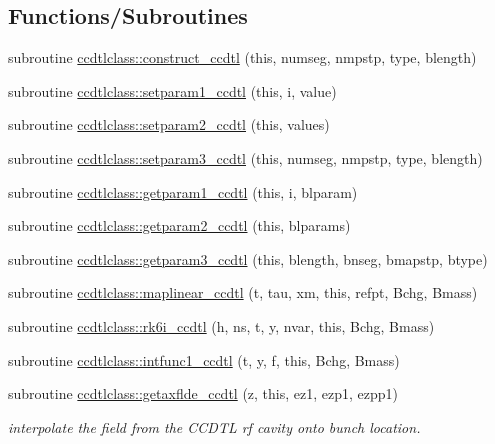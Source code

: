 \subsection*{Functions/\+Subroutines}
\begin{DoxyCompactItemize}
\item 
subroutine \mbox{\hyperlink{namespaceccdtlclass_aaa94d8179c6d59c2d3e81b64e8237962}{ccdtlclass\+::construct\+\_\+ccdtl}} (this, numseg, nmpstp, type, blength)
\item 
subroutine \mbox{\hyperlink{namespaceccdtlclass_adedaabef796136ab3b22dcc923243cfd}{ccdtlclass\+::setparam1\+\_\+ccdtl}} (this, i, value)
\item 
subroutine \mbox{\hyperlink{namespaceccdtlclass_aa32b5665906eac3911db6712a5710f97}{ccdtlclass\+::setparam2\+\_\+ccdtl}} (this, values)
\item 
subroutine \mbox{\hyperlink{namespaceccdtlclass_a3632b0f42925964cedb7778792da563f}{ccdtlclass\+::setparam3\+\_\+ccdtl}} (this, numseg, nmpstp, type, blength)
\item 
subroutine \mbox{\hyperlink{namespaceccdtlclass_a027b988ab66d8b89dabf46f5e45d82f5}{ccdtlclass\+::getparam1\+\_\+ccdtl}} (this, i, blparam)
\item 
subroutine \mbox{\hyperlink{namespaceccdtlclass_a8455f87d9ac20671adf737902c8b90d8}{ccdtlclass\+::getparam2\+\_\+ccdtl}} (this, blparams)
\item 
subroutine \mbox{\hyperlink{namespaceccdtlclass_a529631343d4306c6c486d72e2a6696a3}{ccdtlclass\+::getparam3\+\_\+ccdtl}} (this, blength, bnseg, bmapstp, btype)
\item 
subroutine \mbox{\hyperlink{namespaceccdtlclass_a520796b320588e1f31ce8587301b571b}{ccdtlclass\+::maplinear\+\_\+ccdtl}} (t, tau, xm, this, refpt, Bchg, Bmass)
\item 
subroutine \mbox{\hyperlink{namespaceccdtlclass_aca1c6ac6cdbd554820ab2c213a987647}{ccdtlclass\+::rk6i\+\_\+ccdtl}} (h, ns, t, y, nvar, this, Bchg, Bmass)
\item 
subroutine \mbox{\hyperlink{namespaceccdtlclass_afad7c4471295ba39993a4a180d6a4d54}{ccdtlclass\+::intfunc1\+\_\+ccdtl}} (t, y, f, this, Bchg, Bmass)
\item 
subroutine \mbox{\hyperlink{namespaceccdtlclass_adb7b1c30d3fcb087a5064911ccd4fd1d}{ccdtlclass\+::getaxflde\+\_\+ccdtl}} (z, this, ez1, ezp1, ezpp1)
\begin{DoxyCompactList}\small\item\em interpolate the field from the C\+C\+D\+TL rf cavity onto bunch location. \end{DoxyCompactList}\item 

\end{DoxyCompactItemize}
